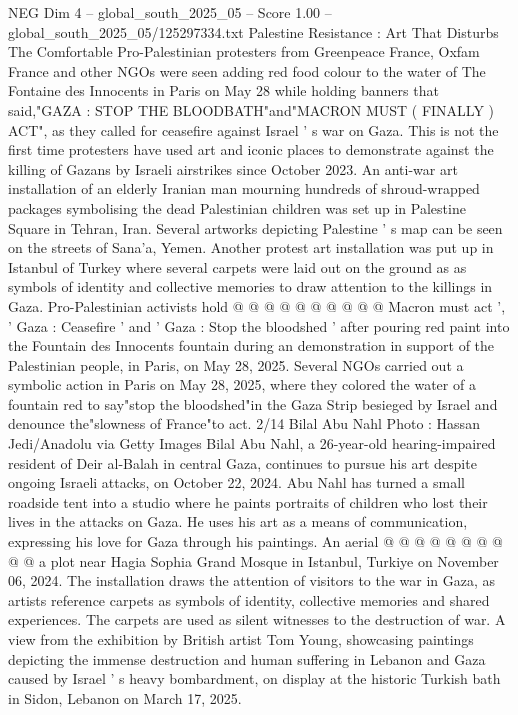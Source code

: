 \begin{textsample}{NEG Dim 4 – global\_south\_2025\_05 – Score 1.00 – global\_south\_2025\_05/125297334.txt}  \label{ex:f4_neg_366}
Palestine Resistance : Art That Disturbs The Comfortable Pro-Palestinian protesters from Greenpeace France, Oxfam France and other NGOs were seen adding red food colour to the water of The Fontaine des Innocents in Paris on May 28 while holding banners that said,"GAZA : STOP THE BLOODBATH"and"MACRON MUST ( FINALLY ) ACT", as they called for ceasefire against Israel ' s war on Gaza.
This is not the first time protesters have used art and iconic places to demonstrate against the killing of Gazans by Israeli airstrikes since October 2023.
An anti-war art installation of an elderly Iranian man mourning hundreds of shroud-wrapped packages symbolising the dead Palestinian children was set up in Palestine Square in Tehran, Iran.
Several artworks depicting Palestine ' s map can be seen on the streets of Sana'a, Yemen.
Another protest art installation was put up in Istanbul of Turkey where several carpets were laid out on the ground as as symbols of identity and collective memories to draw attention to the killings in Gaza.
Pro-Palestinian activists hold @ @ @ @ @ @ @ @ @ @ Macron must act ', ' Gaza : Ceasefire ' and ' Gaza : Stop the bloodshed ' after pouring red paint into the Fountain des Innocents fountain during an demonstration in support of the Palestinian people, in Paris, on May 28, 2025.
Several NGOs carried out a symbolic action in Paris on May 28, 2025, where they colored the water of a fountain red to say"stop the bloodshed"in the Gaza Strip besieged by Israel and denounce the"slowness of France"to act. 2/14 Bilal Abu Nahl Photo : Hassan Jedi/Anadolu via Getty Images Bilal Abu Nahl, a 26-year-old hearing-impaired resident of Deir al-Balah in central Gaza, continues to pursue his art despite ongoing Israeli attacks, on October 22, 2024.
Abu Nahl has turned a small roadside tent into a studio where he paints portraits of children who lost their lives in the attacks on Gaza.
He uses his art as a means of communication, expressing his love for Gaza through his paintings.
An aerial @ @ @ @ @ @ @ @ @ @ a plot near Hagia Sophia Grand Mosque in Istanbul, Turkiye on November 06, 2024.
The installation draws the attention of visitors to the war in Gaza, as artists reference carpets as symbols of identity, collective memories and shared experiences.
The carpets are used as silent witnesses to the destruction of war.
A view from the exhibition by British artist Tom Young, showcasing paintings depicting the immense destruction and human suffering in Lebanon and Gaza caused by Israel ' s heavy bombardment, on display at the historic Turkish bath in Sidon, Lebanon on March 17, 2025.

\end{textsample}
